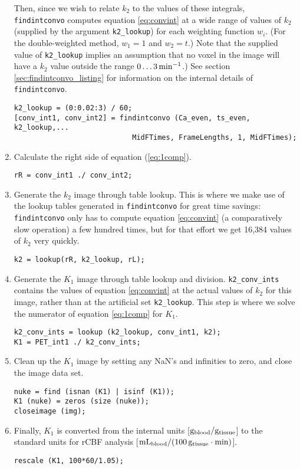 \documentclass[12pt]{article}
\def\code#1{{\tt #1}}
\begin{document}
\begin{enumerate}
Then, since we wish to relate $k_2$ to the values of these integrals,
\code{findintconvo} computes equation \ref{eq:convint} at a wide range
of values of $k_2$ (supplied by the argument \code{k2\_lookup}) for
each weighting function $w_i$.  (For the double-weighted method, $w_1
= 1$ and $w_2 = t$.)  Note that the supplied value of
\code{k2\_lookup} implies an assumption that no voxel in the image
will have a $k_2$ value outside the range $0 \ldots 3\, 
{\rm min}^{-1}$.)  See section \ref{sec:findintconvo_listing} for
information on the internal details of \code{findintconvo}.

\begin{verbatim}
k2_lookup = (0:0.02:3) / 60;
[conv_int1, conv_int2] = findintconvo (Ca_even, ts_even, k2_lookup,...
                            MidFTimes, FrameLengths, 1, MidFTimes);
\end{verbatim}

\item Calculate the right side of equation (\ref{eq:1comp}).
\begin{verbatim}
rR = conv_int1 ./ conv_int2;
\end{verbatim}

\item Generate the $k_2$ image through table lookup.  This is where we
  make use of the lookup tables generated in \code{findintconvo} for
  great time savings: \code{findintconvo} only has to compute equation
  \ref{eq:convint} (a comparatively slow operation) a few hundred
  times, but for that effort we get 16,384 values of $k_2$ very
  quickly.
\begin{verbatim}
k2 = lookup(rR, k2_lookup, rL);
\end{verbatim}

\item Generate the $K_1$ image through table lookup and division.
  \code{k2\_conv\_ints} contains the values of equation \ref{eq:convint}
  at the actual values of $k_2$ for this image, rather than at the
  artificial set \code{k2\_lookup}.  This step is where we solve the
  numerator of equation \ref{eq:1comp} for $K_1$.
\begin{verbatim}
k2_conv_ints = lookup (k2_lookup, conv_int1, k2);
K1 = PET_int1 ./ k2_conv_ints;
\end{verbatim}

\item Clean up the $K_1$ image by setting any NaN's and infinities to
zero, and close the image data set.
\begin{verbatim}
nuke = find (isnan (K1) | isinf (K1));
K1 (nuke) = zeros (size (nuke));
closeimage (img);
\end{verbatim}

\item Finally, $K_1$ is converted from the internal units [${\rm
    g_{blood} / g_{tissue}}$] to the standard units for rCBF
  analysis [${\rm mL_{blood} / (100\, g_{tissue} \cdot min)}$].
\begin{verbatim}
rescale (K1, 100*60/1.05);
\end{verbatim}

\end{enumerate}
\end{document}
